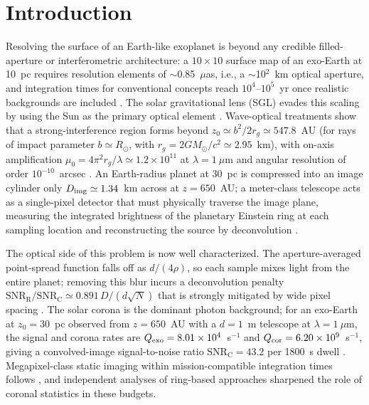 ﻿\documentclass[twocolumn]{emulateapj}
\begin{document}

\section{Introduction}
\label{sec:intro}

Resolving the surface of an Earth-like exoplanet is beyond any credible
filled-aperture or interferometric architecture: a $10\times10$ surface
map of an exo-Earth at 10~pc requires resolution elements of
$\sim$0.85~$\mu$as, i.e., a $\sim$10$^2$~km optical aperture, and
integration times for conventional concepts reach $10^4$--$10^5$~yr once
realistic backgrounds are included \citep{tur26direct}. The solar
gravitational lens (SGL) evades this scaling by using the Sun as the
primary optical element \citep{eshleman79,tt17}. Wave-optical treatments
show that a strong-interference region forms beyond
$z_0\simeq b^2/2r_g\simeq547.8$~AU (for rays of impact parameter
$b\simeq R_\odot$, with $r_g=2GM_\odot/c^2\simeq2.95$~km), with on-axis
amplification $\mu_0=4\pi^2 r_g/\lambda\simeq1.2\times10^{11}$ at
$\lambda=1~\mu$m and angular resolution of order $10^{-10}$~arcsec
\citep{tt17,tt19}. An Earth-radius planet at 30~pc is compressed into an
image cylinder only $D_{\rm img}\simeq1.34$~km across at $z=650$~AU; a
meter-class telescope acts as a single-pixel detector that must
physically traverse the image plane, measuring the integrated brightness
of the planetary Einstein ring at each sampling location and
reconstructing the source by deconvolution
\citep{tt20psf,toth21,tt22mnras}.

The optical side of this problem is now well characterized. The
aperture-averaged point-spread function falls off as $d/(4\rho)$, so each
sample mixes light from the entire planet; removing this blur incurs a
deconvolution penalty $\mathrm{SNR_R/SNR_C}\simeq0.891\,D/(d\sqrt{N})$
that is strongly mitigated by wide pixel spacing \citep{toth21,tt22mnras}.
The solar corona is the dominant photon background; for an exo-Earth at
$z_0=30$~pc observed from $z=650$~AU with a $d=1$~m telescope at
$\lambda=1~\mu$m, the signal and corona rates are
$Q_{\rm exo}=8.01\times10^4$~s$^{-1}$ and
$Q_{\rm cor}=6.20\times10^9$~s$^{-1}$, giving a convolved-image
signal-to-noise ratio $\mathrm{SNR_C}=43.2$ per 1800~s dwell
\citep{tt22mnras,tur26bench}. Megapixel-class static imaging within
mission-compatible integration times follows \citep{toth21,tt22mnras},
and independent analyses of ring-based approaches
\citep{mm22} sharpened the role of coronal statistics in these budgets.
\end{document}
